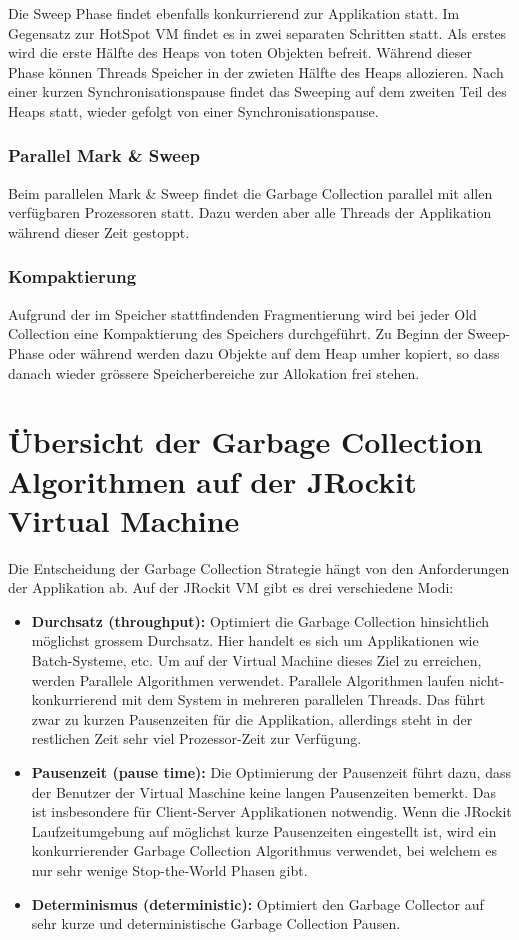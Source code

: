 Die Sweep Phase findet ebenfalls konkurrierend zur Applikation statt. Im Gegensatz zur HotSpot VM findet es in zwei separaten Schritten statt. Als erstes wird die erste Hälfte des Heaps von toten Objekten befreit. Während dieser Phase können Threads Speicher in der zwieten Hälfte des Heaps allozieren. Nach einer kurzen Synchronisationspause findet das Sweeping auf dem zweiten Teil des Heaps statt, wieder gefolgt von einer Synchronisationspause.

\subsubsection{Parallel Mark \& Sweep}
Beim parallelen Mark \& Sweep findet die Garbage Collection parallel mit allen verfügbaren Prozessoren statt. Dazu werden aber alle Threads der Applikation während dieser Zeit gestoppt.

\subsubsection{Kompaktierung}
Aufgrund der im Speicher stattfindenden Fragmentierung wird bei jeder Old Collection eine Kompaktierung des Speichers durchgeführt. Zu Beginn der Sweep-Phase oder während werden dazu Objekte auf dem Heap umher kopiert, so dass danach wieder grössere Speicherbereiche zur Allokation frei stehen.


\section{Übersicht der Garbage Collection Algorithmen auf der JRockit Virtual Machine}
Die Entscheidung der Garbage Collection Strategie hängt von den Anforderungen der Applikation ab. Auf der JRockit VM gibt es drei verschiedene Modi:
\begin{itemize}
	\item \textbf{Durchsatz (throughput):} Optimiert die Garbage Collection hinsichtlich möglichst grossem Durchsatz. Hier handelt es sich um Applikationen wie Batch-Systeme, etc. Um auf der Virtual Machine dieses Ziel zu erreichen, werden Parallele Algorithmen verwendet. Parallele Algorithmen laufen nicht-konkurrierend mit dem System in mehreren parallelen Threads. Das führt zwar zu kurzen Pausenzeiten für die Applikation, allerdings steht in der restlichen Zeit sehr viel Prozessor-Zeit zur Verfügung.
	\item \textbf{Pausenzeit (pause time):} Die Optimierung der Pausenzeit führt dazu, dass der Benutzer der Virtual Maschine keine langen Pausenzeiten bemerkt. Das ist insbesondere für Client-Server Applikationen notwendig. Wenn die JRockit Laufzeitumgebung auf möglichst kurze Pausenzeiten eingestellt ist, wird ein konkurrierender Garbage Collection Algorithmus verwendet, bei welchem es nur sehr wenige Stop-the-World Phasen gibt.
	\item \textbf{Determinismus (deterministic):} Optimiert den Garbage Collector auf sehr kurze und deterministische Garbage Collection Pausen.  
\end{itemize}

